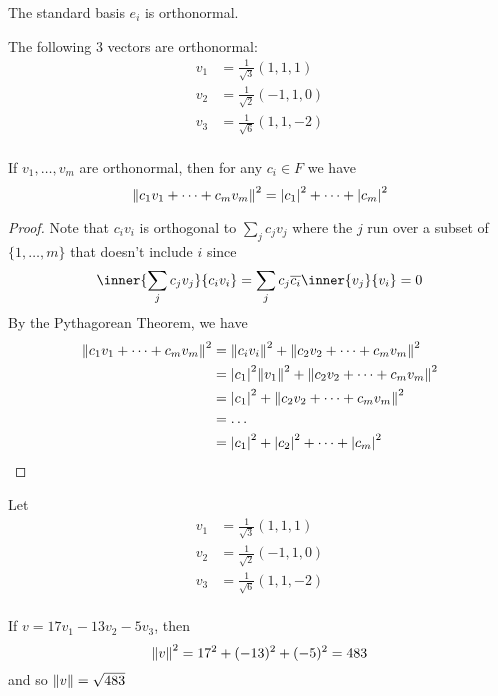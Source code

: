 \documentclass{article}
\begin{document}
\begin{example}
  The standard basis $e_i$ is orthonormal.
\end{example}
\begin{example}
  The following 3 vectors are orthonormal:
  \begin{align*}
    v_1 & = \frac{1}{\sqrt{3}}(1, 1, 1)  \\
    v_2 & = \frac{1}{\sqrt{2}}(-1, 1, 0) \\
    v_3 & = \frac{1}{\sqrt{6}}(1, 1, -2) \\
  \end{align*}
\end{example}
\begin{theorem}
  If $v_1, \ldots, v_m$ are orthonormal, then for any $c_i \in F$ we have \[
    \norm{c_1v_1 + \dots + c_mv_m}^2 = \abs{c_1}^2 + \dots + \abs{c_m}^2
  \]
\end{theorem}
\begin{proof}
  Note that $c_iv_i$ is orthogonal to $\sum_j c_jv_j$ where the $j$ run over a subset of $\{1, \ldots, m\}$ that doesn't include $i$ since \[
    \inner{\sum_j c_jv_j}{c_iv_i} = \sum_j c_j\overline{c_i}\inner{v_j}{v_i} = 0
  \]
  By the Pythagorean Theorem, we have
  \begin{align*}
    \norm{c_1v_1 + \dots + c_mv_m}^2 & = \norm{c_iv_i}^2 + \norm{c_2v_2 + \dots + c_mv_m}^2         \\
                                     & = \abs{c_1}^2\norm{v_1}^2 + \norm{c_2v_2 + \dots + c_mv_m}^2 \\
                                     & = \abs{c_1}^2 + \norm{c_2v_2 + \dots + c_mv_m}^2             \\
                                     & = \dots                                                      \\
                                     & = \abs{c_1}^2 + \abs{c_2}^2 + \dots + \abs{c_m}^2            \\
  \end{align*}
\end{proof}
\begin{example}
  Let
  \begin{align*}
    v_1 & = \frac{1}{\sqrt{3}}(1, 1, 1)  \\
    v_2 & = \frac{1}{\sqrt{2}}(-1, 1, 0) \\
    v_3 & = \frac{1}{\sqrt{6}}(1, 1, -2) \\
  \end{align*}

  If $v = 17v_1 -13v_2 -5v_3$, then \[
    \norm{v}^2 = 17^2 + (-13)^2 + (-5)^2 = 483
  \] and so $\norm{v} = \sqrt{483}$
\end{example}
\end{document}
